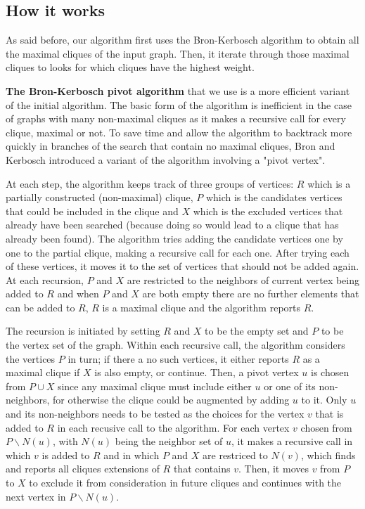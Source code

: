 \subsection{How it works}

As said before, our algorithm first uses the Bron-Kerbosch algorithm to obtain
all the maximal cliques of the input graph. Then, it iterate through those maximal
cliques to looks for which cliques have the highest weight. \newline

\textbf{The Bron-Kerbosch pivot algorithm} that we use is a more efficient variant
of the initial algorithm. The basic form of the algorithm is inefficient in the
case of graphs with many non-maximal cliques as it makes a recursive call for
every clique, maximal or not. To save time and allow the algorithm to backtrack
more quickly in branches of the search that contain no maximal cliques, Bron and
Kerbosch introduced a variant of the algorithm involving a "pivot vertex". \newline

At each step, the algorithm keeps track of three groups of vertices: $R$ which is
a partially constructed (non-maximal) clique, $P$ which is the candidates vertices
that could be included in the clique and $X$ which is the excluded vertices that
already have been searched (because doing so would lead to a clique that has
already been found). The algorithm tries adding the candidate vertices one by one
to the partial clique, making a recursive call for each one. After trying each of
these vertices, it moves it to the set of vertices that should not be added again.
At each recursion, $P$ and $X$ are restricted to the neighbors of current vertex
being added to $R$ and when $P$ and $X$ are both empty there are no further
elements that can be added to $R$, $R$ is a maximal clique and the algorithm
reports $R$. \newline

The recursion is initiated by setting $R$ and $X$ to be the empty set and $P$ to
be the vertex set of the graph. Within each recursive call, the algorithm considers
the vertices $P$ in turn; if there a no such vertices, it either reports $R$ as
a maximal clique if $X$ is also empty, or continue. Then, a pivot vertex $u$ is
chosen from $P\cup X$ since any maximal clique must include either $u$ or one of
its non-neighbors, for otherwise the clique could be augmented by adding $u$ to it.
Only $u$ and its non-neighbors needs to be tested as the choices for the vertex
$v$ that is added to $R$ in each recusive call to the algorithm. For each vertex
$v$ chosen from $P\backslash N(u)$, with $N(u)$ being the neighbor set of $u$,
it makes a recursive call in which $v$ is added to $R$ and in which $P$ and $X$
are restriced to $N(v)$, which finds and reports all cliques extensions of $R$
that contains $v$. Then, it moves $v$ from $P$ to $X$ to exclude it from consideration
in future cliques and continues with the next vertex in $P\backslash N(u)$. \newline

